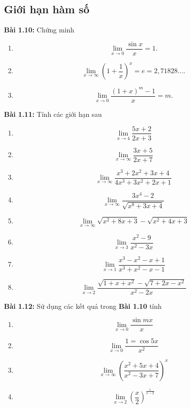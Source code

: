 \subsection*{Giới hạn hàm số}
\textbf{Bài 1.10:} Chứng minh
\begin{enumerate}[label=(\alph*)]
    \item $$\lim_{x\rightarrow 0}\frac{\sin x}{x}=1.$$
    \item $$\lim_{x\rightarrow\infty}\left(1+\frac{1}{x}\right)^x =e=2,71828... .$$
    \item \[\lim_{x\rightarrow 0}\frac{(1+x)^m -1}{x}=m.\]
\end{enumerate}
\vspace{5pt}

\textbf{Bài 1.11:} Tính các giới hạn sau 
\begin{enumerate}[label=(\alph*)]
    \item $$\lim_{x\rightarrow 4}\frac{5x+2}{2x+3}$$
    \item $$\lim_{x\rightarrow \infty}\frac{3x+5}{2x+7} $$
    \item $$\lim_{x\rightarrow\infty}\frac{x^3 +2x^2 +3x+4}{4x^3 +3x^2 +2x+1}$$
    \item $$\lim_{x\rightarrow\infty}\frac{3x^4 -2}{\sqrt{x^8+3x+4}}$$
    \item \[\lim_{x\rightarrow\infty}\sqrt{x^2 +8x+3}-\sqrt{x^2+4x+3}\]
    \item \[\lim_{x\rightarrow 3}\frac{x^2 -9}{x^2-3x}\]
    \item \[\lim_{x\rightarrow 1}\frac{x^3 -x^2 -x+1}{x^3+x^2 -x-1}\]
    \item \[\lim_{x\rightarrow 2}\frac{\sqrt{1+x+x^2}-\sqrt{7+2x-x^2}}{x^2-2x}\]
\end{enumerate}
\vspace{5pt}

\textbf{Bài 1.12:} Sử dụng các kết quả trong \textbf{Bài 1.10} tính
\begin{enumerate}[label=(\alph*)]
    \item \[\lim_{x\rightarrow 0}\frac{\sin mx}{x}\]
    \item \[\lim_{x\rightarrow 0}\frac{1=\cos 5x}{x^2}\]
    \item \[\lim_{x\rightarrow\infty}\left(\frac{x^2+5x+4}{x^2-3x+7}\right)^x\]
    \item \[\lim_{x\rightarrow 2}\left(\frac{x}{2}\right)^{\frac{1}{x-2}}\]
\end{enumerate}

